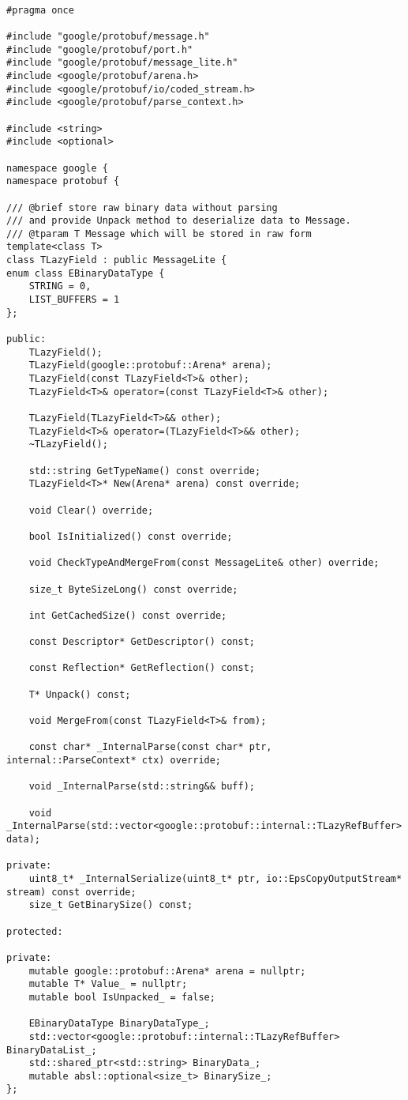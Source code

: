 \begin{lstlisting}[style=CodeListing, label=sec_impl:code:lazy_field_h, caption={Описание класса LazyField}]

#pragma once

#include "google/protobuf/message.h"
#include "google/protobuf/port.h"
#include "google/protobuf/message_lite.h"
#include <google/protobuf/arena.h>
#include <google/protobuf/io/coded_stream.h>
#include <google/protobuf/parse_context.h>

#include <string>
#include <optional>

namespace google {
namespace protobuf {

/// @brief store raw binary data without parsing
/// and provide Unpack method to deserialize data to Message.
/// @tparam T Message which will be stored in raw form
template<class T>
class TLazyField : public MessageLite {
enum class EBinaryDataType {
    STRING = 0,
    LIST_BUFFERS = 1
};

public:
    TLazyField();
    TLazyField(google::protobuf::Arena* arena);
    TLazyField(const TLazyField<T>& other);
    TLazyField<T>& operator=(const TLazyField<T>& other);

    TLazyField(TLazyField<T>&& other);
    TLazyField<T>& operator=(TLazyField<T>&& other);
    ~TLazyField();

    std::string GetTypeName() const override;
    TLazyField<T>* New(Arena* arena) const override;

    void Clear() override;

    bool IsInitialized() const override;

    void CheckTypeAndMergeFrom(const MessageLite& other) override;

    size_t ByteSizeLong() const override;

    int GetCachedSize() const override;

    const Descriptor* GetDescriptor() const;

    const Reflection* GetReflection() const;

    T* Unpack() const;

    void MergeFrom(const TLazyField<T>& from);

    const char* _InternalParse(const char* ptr, internal::ParseContext* ctx) override;

    void _InternalParse(std::string&& buff);

    void _InternalParse(std::vector<google::protobuf::internal::TLazyRefBuffer> data);

private:
    uint8_t* _InternalSerialize(uint8_t* ptr, io::EpsCopyOutputStream* stream) const override;
    size_t GetBinarySize() const;

protected:

private:
    mutable google::protobuf::Arena* arena = nullptr;
    mutable T* Value_ = nullptr;
    mutable bool IsUnpacked_ = false;

    EBinaryDataType BinaryDataType_;
    std::vector<google::protobuf::internal::TLazyRefBuffer> BinaryDataList_;
    std::shared_ptr<std::string> BinaryData_;
    mutable absl::optional<size_t> BinarySize_;
};

\end{lstlisting}

